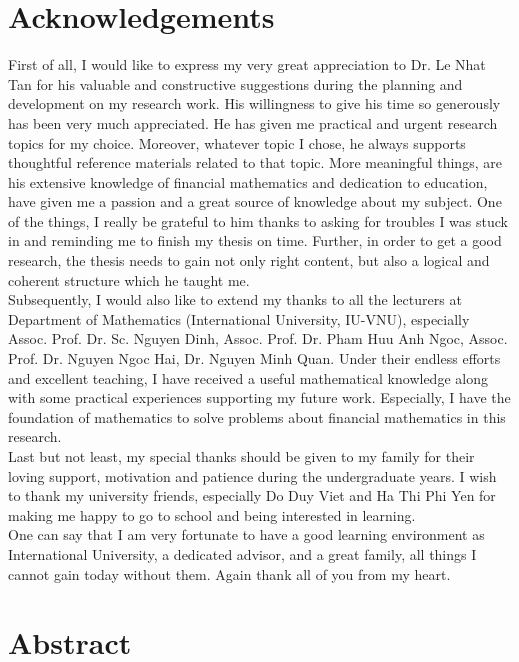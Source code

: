 \documentclass[12pt,a4paper,left=2cm,right=2cm,oneside,titlepage]{report}
\numberwithin{equation}{section}
\begin{document}
\chapter*{Acknowledgements}

\fontsize{11pt}{20pt}\selectfont  First of all, I would like to express my very great appreciation to Dr. Le Nhat Tan for his valuable and constructive suggestions during the planning and development on my research work. His willingness to give his time so generously has been very much appreciated. He has given me practical and urgent research topics for my choice. Moreover, whatever topic I chose, he always supports thoughtful reference materials related to that topic. More meaningful things, are his extensive knowledge of financial mathematics and dedication to education, have given me a passion and a great source of knowledge about my subject. One of the things,  I really be grateful to him thanks to asking for troubles I was stuck in and reminding me to finish my thesis on time. Further, in order to get a good research, the thesis needs to gain not only right content, but also a logical and coherent structure which he taught me. \\[0.5cm]
Subsequently, I would also like to extend my thanks to all the lecturers at Department of Mathematics
(International University, IU-VNU), especially Assoc. Prof. Dr. Sc. Nguyen
Dinh, Assoc. Prof. Dr. Pham Huu Anh Ngoc, Assoc. Prof. Dr. Nguyen Ngoc Hai, Dr. Nguyen Minh Quan. Under their endless efforts and excellent teaching, I have received a useful mathematical knowledge along with some practical experiences supporting my future work. Especially, I have the foundation of mathematics to solve problems about financial mathematics in this research. \\[0.5cm]
Last but not least, my special thanks should be given to my family for their loving
support, motivation and patience during the undergraduate years. I wish to thank my university friends, especially Do Duy Viet and Ha Thi Phi Yen for making me happy to go to school and being interested in learning.\\[0.5cm] 
 One can say that I am very fortunate to have a good learning environment as International University, a dedicated advisor, and a great family, all things I cannot gain today without them. Again thank all of you from my heart.

 
  \chapter*{Abstract}
  
\end{document}

